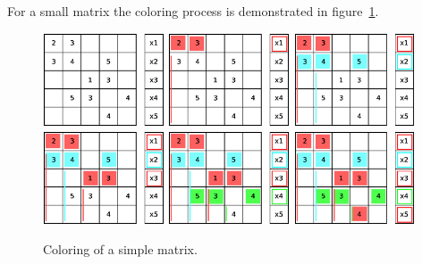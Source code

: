 \documentclass[a4paper,11pt]{scrartcl}
\begin{document}
For a small matrix the coloring process is demonstrated in
figure~\ref{figure:coloringGS}.

\begin{figure}
\includegraphics[width=0.32\textwidth]{graphic/coloringGS1.eps}\hfill\vline\hfill
\includegraphics[width=0.32\textwidth]{graphic/coloringGS4.eps}\hfill\vline\hfill
\includegraphics[width=0.32\textwidth]{graphic/coloringGS7.eps}
\includegraphics[width=0.32\textwidth]{graphic/coloringGS8.eps}\hfill\vline\hfill
\includegraphics[width=0.32\textwidth]{graphic/coloringGS9.eps}\hfill\vline\hfill
\includegraphics[width=0.32\textwidth]{graphic/coloringGS10.eps}
\caption{Coloring of a simple matrix.}\label{figure:coloringGS}
\end{figure}
\end{document}
